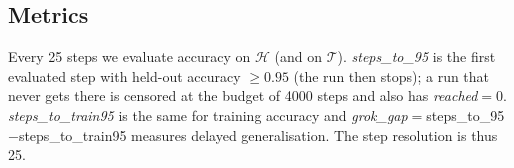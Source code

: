 \subsection{Metrics}
Every 25 steps we evaluate accuracy on $\mathcal{H}$ (and on $\mathcal{T}$). \emph{steps\_to\_95} is the first evaluated step with held-out accuracy $\ge0.95$ (the run then stops); a run that never gets there is censored at the budget of 4000 steps and also has \emph{reached}$=0$. \emph{steps\_to\_train95} is the same for training accuracy and \emph{grok\_gap}$=$steps\_to\_95$-$steps\_to\_train95 measures delayed generalisation. The step resolution is thus 25.
